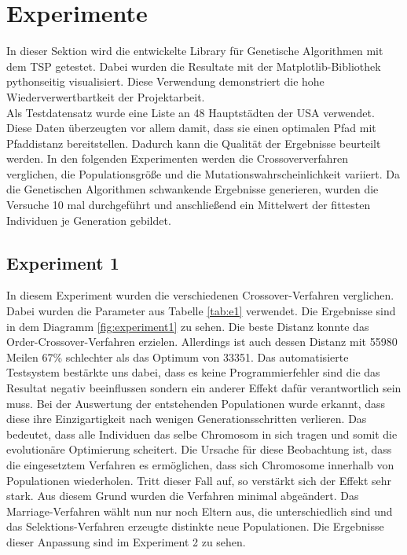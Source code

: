 
\section{Experimente}
In dieser Sektion wird die entwickelte Library für Genetische Algorithmen mit dem TSP getestet. Dabei wurden die Resultate mit der Matplotlib-Bibliothek pythonseitig visualisiert.
Diese Verwendung demonstriert die hohe Wiederverwertbartkeit der Projektarbeit.\\
Als Testdatensatz wurde eine Liste an 48 Hauptstädten der USA verwendet. Diese Daten überzeugten vor allem damit, dass sie einen optimalen Pfad mit Pfaddistanz bereitstellen. Dadurch kann die Qualität der Ergebnisse beurteilt werden.
In den folgenden Experimenten werden die Crossoververfahren verglichen, die Populationsgröße und die Mutationswahrscheinlichkeit variiert. Da die Genetischen Algorithmen schwankende Ergebnisse generieren, wurden die Versuche 10 mal durchgeführt und anschließend ein Mittelwert der fittesten Individuen je Generation gebildet. 

\subsection{Experiment 1}
In diesem Experiment wurden die verschiedenen Crossover-Verfahren verglichen. Dabei wurden die Parameter aus Tabelle \ref{tab:e1} verwendet. Die Ergebnisse sind in dem Diagramm \ref{fig:experiment1} zu sehen. 
Die beste Distanz konnte das Order-Crossover-Verfahren erzielen. Allerdings ist auch dessen Distanz mit 55980 Meilen 67\% schlechter als das Optimum von 33351. Das automatisierte Testsystem bestärkte uns dabei, dass es keine Programmierfehler sind die das Resultat negativ beeinflussen sondern ein anderer Effekt dafür verantwortlich sein muss. Bei der Auswertung der entstehenden Populationen wurde erkannt, dass diese ihre Einzigartigkeit nach wenigen Generationsschritten verlieren. Das bedeutet, dass alle Individuen das selbe Chromosom in sich tragen und somit die evolutionäre Optimierung scheitert.
Die Ursache für diese Beobachtung ist, dass die eingesetztem Verfahren es ermöglichen, dass sich Chromosome innerhalb von Populationen wiederholen. Tritt dieser Fall auf, so verstärkt sich der Effekt sehr stark. Aus diesem Grund wurden die Verfahren minimal abgeändert. Das Marriage-Verfahren wählt nun nur noch Eltern aus, die unterschiedlich sind und das Selektions-Verfahren erzeugte distinkte neue Populationen. Die Ergebnisse dieser Anpassung sind im Experiment 2 zu sehen.

